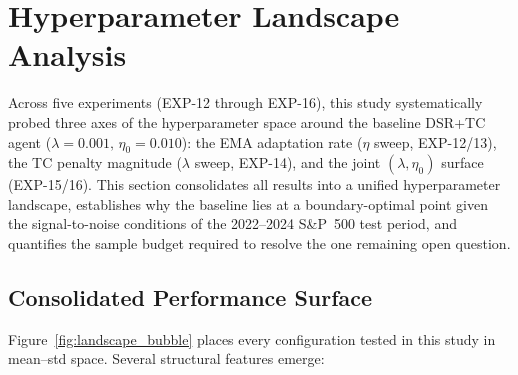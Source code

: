 \documentclass[conference]{IEEEtran}
\begin{document}
\section{Hyperparameter Landscape Analysis}
\label{sec:landscape}

Across five experiments (EXP-12 through EXP-16), this study
systematically probed three axes of the hyperparameter space
around the baseline DSR+TC agent
($\lambda=0.001,\,\eta_0=0.010$): the EMA adaptation rate
($\eta$ sweep, EXP-12/13), the TC penalty magnitude
($\lambda$ sweep, EXP-14), and the joint
$(\lambda, \eta_0)$ surface (EXP-15/16).
This section consolidates all results into a unified
hyperparameter landscape, establishes why the baseline lies
at a boundary-optimal point given the signal-to-noise
conditions of the 2022--2024 S\&P~500 test period, and
quantifies the sample budget required to resolve the
one remaining open question.

\subsection{Consolidated Performance Surface}

Figure~\ref{fig:landscape_bubble} places every configuration
tested in this study in mean--std space. Several structural
features emerge:
\end{document}
